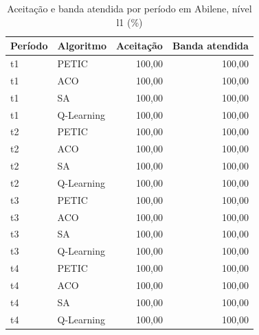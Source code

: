 \begin{table}[htb]
    \centering
    \scriptsize
    \caption{Aceitação e banda atendida por período em Abilene, nível l1 (\%)}
    \label{tab:periodos-abilene-l1}
    \begin{tabular}{llrr}
        \hline
        Período & Algoritmo & Aceitação & Banda atendida \\
        \hline
        t1 & PETIC & 100,00 & 100,00 \\
        t1 & ACO & 100,00 & 100,00 \\
        t1 & SA & 100,00 & 100,00 \\
        t1 & Q-Learning & 100,00 & 100,00 \\
        t2 & PETIC & 100,00 & 100,00 \\
        t2 & ACO & 100,00 & 100,00 \\
        t2 & SA & 100,00 & 100,00 \\
        t2 & Q-Learning & 100,00 & 100,00 \\
        t3 & PETIC & 100,00 & 100,00 \\
        t3 & ACO & 100,00 & 100,00 \\
        t3 & SA & 100,00 & 100,00 \\
        t3 & Q-Learning & 100,00 & 100,00 \\
        t4 & PETIC & 100,00 & 100,00 \\
        t4 & ACO & 100,00 & 100,00 \\
        t4 & SA & 100,00 & 100,00 \\
        t4 & Q-Learning & 100,00 & 100,00 \\
        \hline
    \end{tabular}
\end{table}

